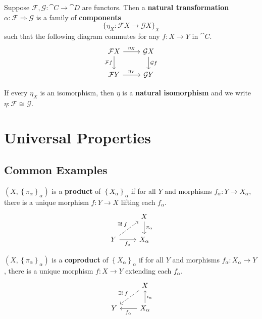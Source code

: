 \documentclass[twoside,10pt]{report}
\begin{document}
\begin{defn}
Suppose $\mathcal{F},\mathcal{G}:\cat{C}\to \cat{D}$ are functors. Then a \textbf{natural transformation} $\alpha:\mathcal{F}\Rightarrow \mathcal{G}$ is a family of \textbf{components}
\[
	\{ \eta_X: \mathcal{F}X \to \mathcal{G}X\}_X
\] such that the following diagram commutes for any $f:X\to Y$ in $\cat{C}$.
\[
\begin{tikzcd}
	\mathcal{F}X \rar{\eta_{X}} \arrow[d, "\mathcal{F}f"'] & \mathcal{G}X \dar{\mathcal{G}f} \\
	\mathcal{F}Y \rar{\eta_{Y}} & \mathcal{G}Y
\end{tikzcd}
\] 
\end{defn}
If every $\eta_{X}$ is an isomorphism, then $\eta$ is a \textbf{natural isomorphism} and we write $\eta: \mathcal{F} \cong \mathcal{G}$.



\chapter{Universal Properties}

\section{Common Examples}

\begin{defn}[]
$(X, \left\{ \pi_{\alpha} \right\}_{\alpha})$ is a \textbf{product} of $\left\{ X_{\alpha} \right\}_{\alpha}$ if for all $Y$ and morphisms $f_{\alpha}:Y\to X_{\alpha}$, there is a unique morphism $f:Y\to X$ lifting each $f_{\alpha}$.
\[
\begin{tikzcd}
	& X\dar{\pi_{\alpha}} \\
	Y \arrow[ur,dashed,"\exists!\;f"]\rar["f_{\alpha}"'] & X_{\alpha}
\end{tikzcd}
\] 
\end{defn}

\begin{defn}[]
	$(X,  \left\{ \pi_{\alpha} \right\}_{\alpha})$ is a \textbf{coproduct} of $\left\{ X_{\alpha} \right\}_{\alpha}$ if for all $Y$ and morphisms $f_{\alpha}:X_{\alpha}\to Y$, there is a unique morphism $f:X\to Y$ extending each $f_{\alpha}$.
	\[
	\begin{tikzcd}
		& X\arrow[dl,dashed,"\exists!\;f"'] \\
		Y & X_{\alpha}\lar{f_{\alpha}}\uar["i_{\alpha}"']
	\end{tikzcd}
	\] 
\end{defn}
\end{document}
